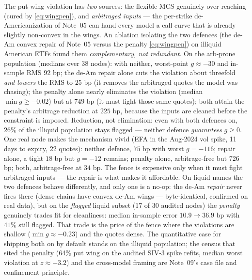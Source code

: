 \documentclass[11pt]{article}
\begin{document}
\begin{remark}
The put-wing violation has \emph{two} sources: the flexible MCS genuinely
over-reaching (cured by \eqref{eq:wingpen}), and \emph{arbitraged inputs} --- the
per-strike de-Americanization of Note~05 can hand every model a call curve that is
already slightly non-convex in the wings. An ablation isolating the two defences
(the de-Am convex repair of Note~05 versus the penalty \eqref{eq:wingpen}) on
illiquid American ETFs found them \emph{complementary, not redundant}. On the
arb-prone population (medians over 38 nodes): with neither, worst-point
$g\approx-30$ and in-sample RMS $92$ bp; the de-Am repair alone cuts the
violation about threefold \emph{and lowers} the RMS to $25$ bp (it removes the
arbitraged quotes the model was chasing); the penalty alone nearly eliminates
the violation (median $\min g\ge-0.02$) but at $749$ bp (it must fight those
same quotes); both attain the penalty's arbitrage reduction at $225$ bp,
because the inputs are cleaned before the constraint is imposed. Reduction,
not elimination: even with both defences on, $26\%$ of the illiquid
population stays flagged --- neither defence \emph{guarantees} $g\ge0$. One
real node makes the mechanism vivid (EFA in the Aug-2024 vol spike, 11 days
to expiry, 22 quotes): neither defence, $75$ bp with worst $g=-116$; repair
alone, a tight $18$ bp but $g=-12$ remains; penalty alone, arbitrage-free but
$726$ bp; both, arbitrage-free at $34$ bp. The fence is expensive only when
it must fight arbitraged inputs --- the repair is what makes it affordable.
On liquid names the two defences behave differently, and only one is a no-op:
the de-Am \emph{repair} never fires there (dense chains have convex de-Am
wings --- byte-identical, confirmed on real data), but on the \emph{flagged}
liquid subset (17 of 30 audited nodes) the \emph{penalty} genuinely trades
fit for cleanliness: median in-sample error $10.9\to36.9$ bp with $41\%$
still flagged. That trade is the price of the fence where the violations are
shallow ($\min g\approx-0.23$) and the quotes dense. The quantitative case
for shipping both on by default stands on the illiquid population; the census
that sited the penalty (64\% put wing on the audited SIV-3 spike refits,
median worst violation at $z\approx-3.2$) and the cross-model framing are
Note~09's case file and confinement principle.
\end{remark}

\end{document}
